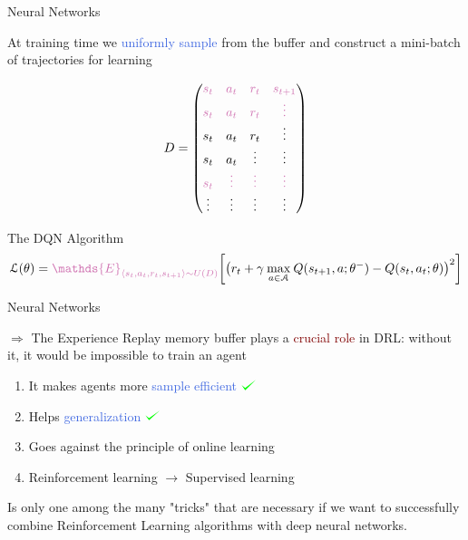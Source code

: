 \documentclass{beamer}
\newcommand{\xmark}{\ding{55}}
\def\checkmark{\tikz\fill[scale=0.4](0,.35) -- (.25,0) -- (1,.7) -- (.25,.15) -- cycle;}
\begin{document}
\begin{frame}{Neural Networks}

	At training time we \textcolor{RoyalBlue}{uniformly sample} from the buffer and construct a \textcolor{skymagenta}{mini-batch} of trajectories for learning
	
	\begin{equation*}
		D = 
		\begin{pmatrix}
			\textcolor{skymagenta}{s_t} & \textcolor{skymagenta}{a_t} & \textcolor{skymagenta}{r_t} & \textcolor{skymagenta}{s_{t+1}} \\
			\textcolor{skymagenta}{s_t} & \textcolor{skymagenta}{a_t} & \textcolor{skymagenta}{r_t} & \textcolor{skymagenta}{\vdots} \\
			s_t & a_t & r_t & \vdots \\
			s_t & a_t & \vdots & \vdots \\
			\textcolor{skymagenta}{s_t} & \textcolor{skymagenta}{\vdots} & \textcolor{skymagenta}{\vdots} & \textcolor{skymagenta}{\vdots} \\
			\vdots & \vdots & \vdots & \vdots \\
		\end{pmatrix}
	\end{equation*}

	\begin{block}{The DQN Algorithm}
		\begin{multline*}
			\mathcal{L}(\theta) = \textcolor{skymagenta}{\mathds{E}_{\langle s_{t},a_{t},r_{t},s_{t+1}\rangle\sim U(D)}} \bigg[\big(r_{t} + \gamma \: \underset{a\in \mathcal{A}}{\max}\: Q(s_{t+1}, a; \theta^{-}) - Q(s_{t}, a_{t}; \theta) \big)^{2}\bigg]
		\end{multline*}
	\end{block}

\end{frame}

\begin{frame}{Neural Networks}

	$\Rightarrow$ The Experience Replay memory buffer plays a \textcolor{Maroon}{crucial role} in DRL: without it, it would be impossible to train an agent

	\bigskip

	\begin{enumerate}
		\item It makes agents more \textcolor{RoyalBlue}{sample efficient} $\textcolor{green}{\checkmark}$
		\item Helps \textcolor{RoyalBlue}{generalization} $\textcolor{green}{\checkmark}$ 
		\item Goes against the principle of online learning \textcolor{red}{\xmark}
		\item Reinforcement learning $\rightarrow$ Supervised learning \textcolor{red}{\xmark}
	\end{enumerate}

	\bigskip 

	Is only one among the many "tricks" that are necessary if we want to successfully combine Reinforcement Learning algorithms with deep neural networks.

\end{frame}
\end{document}
